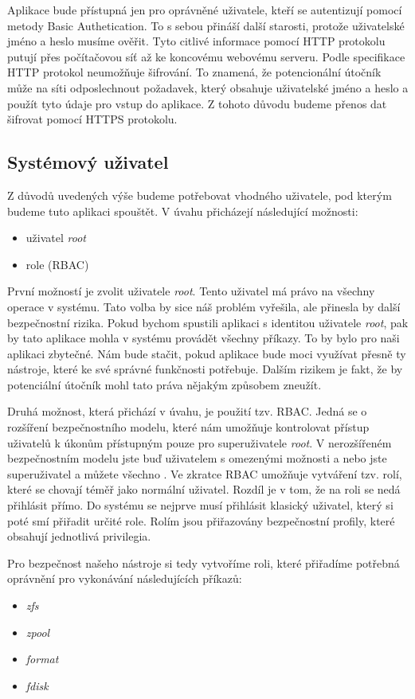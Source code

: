 Aplikace bude přístupná jen pro oprávněné uživatele, kteří se autentizují pomocí metody Basic Authetication. To s sebou přináší další starosti, protože uživatelské jméno a heslo musíme ověřit. Tyto citlivé informace pomocí HTTP protokolu putují přes počítačovou síť až ke koncovému webovému serveru. Podle specifikace \cite{RFC2616} HTTP protokol neumožňuje šifrování. To znamená, že potencionální útočník může na síti odposlechnout požadavek, který obsahuje uživatelské jméno a heslo a použít tyto údaje pro vstup do aplikace. Z tohoto důvodu budeme přenos dat šifrovat pomocí HTTPS protokolu.
    \subsection{Systémový uživatel}
    \label{sysuser}
    Z důvodů uvedených výše budeme potřebovat vhodného uživatele, pod kterým budeme tuto aplikaci spouštět. V úvahu přicházejí následující možnosti:
    \begin{itemize}
      \item uživatel \emph{root}
      \item role (RBAC)
    \end{itemize}

    První možností je zvolit uživatele \emph{root}. Tento uživatel má právo na všechny operace v systému. Tato volba by sice náš problém vyřešila, ale přinesla by další bezpečnostní rizika. Pokud bychom spustili aplikaci s identitou uživatele \emph{root}, pak by tato aplikace mohla v systému provádět všechny příkazy. To by bylo pro naši aplikaci zbytečné. Nám bude stačit, pokud aplikace bude moci využívat přesně ty nástroje, které ke své správné funkčnosti potřebuje. Dalším rizikem je fakt, že by potenciální útočník mohl tato práva nějakým způsobem zneužít.

    Druhá možnost, která přichází v úvahu, je použití tzv. RBAC. Jedná se o rozšíření bezpečnostního modelu, které nám umožňuje kontrolovat přístup uživatelů k úkonům přístupným pouze pro superuživatele \emph{root}. V nerozšířeném bezpečnostním modelu jste buď uživatelem s omezenými možnosti a nebo jste superuživatel a můžete všechno \cite{RBAC}. Ve zkratce RBAC umožňuje vytváření tzv. rolí, které se chovají téměř jako normální uživatel. Rozdíl je v tom, že na roli se nedá přihlásit přímo. Do systému se nejprve musí přihlásit klasický uživatel, který si poté smí přiřadit určité role. Rolím jsou přiřazovány bezpečnostní profily, které obsahují jednotlivá privilegia.

    Pro bezpečnost našeho nástroje si tedy vytvoříme roli, které přiřadíme potřebná oprávnění pro vykonávání následujících příkazů:
    \begin{itemize}
      \item \emph{zfs}
      \item \emph{zpool}
      \item \emph{format}
      \item \emph{fdisk}
    \end{itemize}

